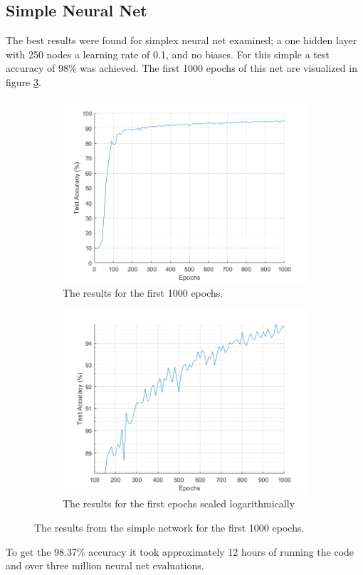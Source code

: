\documentclass[12pt]{article}
\begin{document}
	\subsection{Simple Neural Net}
	The best results were found for simplex neural net examined; a one hidden layer with 250 nodes a learning rate of 0.1, and no biases. For this simple a test accuracy of 98\% was achieved. The first 1000 epochs of this net are visualized in figure \ref{fig:250_all}.
	\begin{figure}
		\centering
		\begin{subfigure}{.5\textwidth}
			\centering
			\includegraphics[width=\linewidth]{250_results}
			\caption{The results for the first 1000 epochs.}
			\label{fig:250results}
		\end{subfigure}%
		\begin{subfigure}{.5\textwidth}
			\centering
			\includegraphics[width=\linewidth]{250_results_log}
			\caption{The results for the first epochs scaled logarithmically}
			\label{fig:250resultslog}
		\end{subfigure}
		\caption{The results from the simple network for the first 1000 epochs.}
		\label{fig:250_all}
	\end{figure}
	To get the 98.37\% accuracy it took approximately 12 hours of running the code and over three million neural net evaluations.
	
\end{document}

